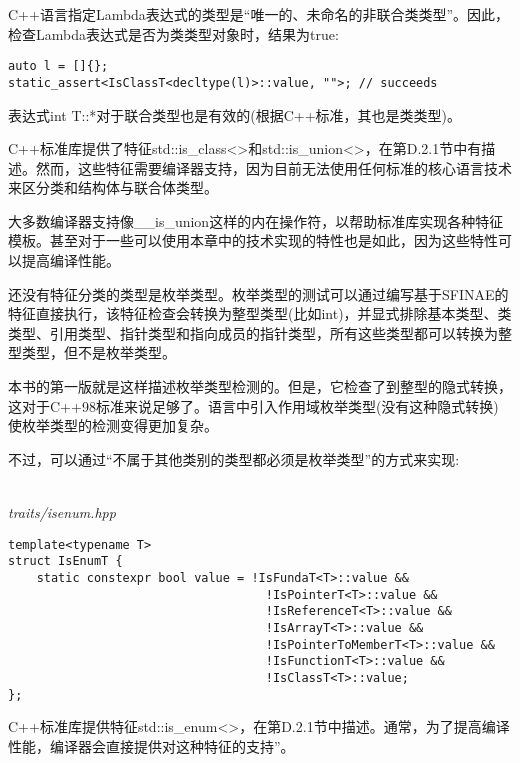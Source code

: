 C++语言指定Lambda表达式的类型是“唯一的、未命名的非联合类类型”。因此，检查Lambda表达式是否为类类型对象时，结果为true:

\begin{lstlisting}[style=styleCXX]
auto l = []{};
static_assert<IsClassT<decltype(l)>::value, "">; // succeeds
\end{lstlisting}

表达式int T::*对于联合类型也是有效的(根据C++标准，其也是类类型)。

C++标准库提供了特征std::is\_class<>和std::is\_union<>，在第D.2.1节中有描述。然而，这些特征需要编译器支持，因为目前无法使用任何标准的核心语言技术来区分类和结构体与联合体类型。

\begin{tcolorbox}[colback=webgreen!5!white,colframe=webgreen!75!black]
\hspace*{0.75cm}大多数编译器支持像\_\_is\_union这样的内在操作符，以帮助标准库实现各种特征模板。甚至对于一些可以使用本章中的技术实现的特性也是如此，因为这些特性可以提高编译性能。
\end{tcolorbox}


还没有特征分类的类型是枚举类型。枚举类型的测试可以通过编写基于SFINAE的特征直接执行，该特征检查会转换为整型类型(比如int)，并显式排除基本类型、类类型、引用类型、指针类型和指向成员的指针类型，所有这些类型都可以转换为整型类型，但不是枚举类型。

\begin{tcolorbox}[colback=webgreen!5!white,colframe=webgreen!75!black]
\hspace*{0.75cm}本书的第一版就是这样描述枚举类型检测的。但是，它检查了到整型的隐式转换，这对于C++98标准来说足够了。语言中引入作用域枚举类型(没有这种隐式转换)使枚举类型的检测变得更加复杂。
\end{tcolorbox}

不过，可以通过“不属于其他类别的类型都必须是枚举类型”的方式来实现:

\hspace*{\fill} \\ %
\noindent
\textit{traits/isenum.hpp}
\begin{lstlisting}[style=styleCXX]
template<typename T>
struct IsEnumT {
	static constexpr bool value = !IsFundaT<T>::value &&
									!IsPointerT<T>::value &&
									!IsReferenceT<T>::value &&
									!IsArrayT<T>::value &&
									!IsPointerToMemberT<T>::value &&
									!IsFunctionT<T>::value &&
									!IsClassT<T>::value;
};
\end{lstlisting}

C++标准库提供特征std::is\_enum<>，在第D.2.1节中描述。通常，为了提高编译性能，编译器会直接提供对这种特征的支持”。














